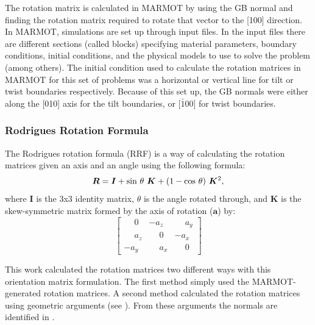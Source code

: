 \documentclass[twoside,senior]{BYUPhys}
\begin{document}
The rotation matrix is calculated in MARMOT by using the GB normal and finding the rotation matrix required to rotate that vector to the [100] direction.  In MARMOT, simulations are set up through input files.  In the input files there are different sections (called blocks) specifying material parameters, boundary conditions, initial conditions, and the physical models to use to solve the problem (among others).  The initial condition used to calculate the rotation matrices in MARMOT for this set of problems was a horizontal or vertical line for tilt or twist boundaries respectively.  Because of this set up, the GB normals were either along the [010] axis for the tilt boundaries, or [$\bar{1}$00] for twist boundaries.

\subsubsection{Rodrigues Rotation Formula\label{PQ:RRF}}
The Rodrigues rotation formula\cite{belongie2006} (RRF) is a way of calculating the rotation matrices given an axis and an angle using the following formula:
\begin{equation}
\label{eq:rrf}
\bm{R} = \bm{I} + \textnormal{sin}\ \theta\ \bm{K} + (1 - \textnormal{cos}\ \theta)\ \bm{K}^2,
\end{equation}
where $\bm{I}$ is the 3x3 identity matrix, $\theta$ is the angle rotated through, and $\bm{K}$ is the skew-symmetric matrix formed by the axis of rotation ($\bm{a}$) by:
\begin{equation}
\label{eq:skewSymMat}
\left[
\begin{array}{ccc}
\phantom{-}0 & -a_z & \phantom{-}a_y \\
\phantom{-}a_z & \phantom{-}0 & -a_x \\
-a_y & \phantom{-}a_x & \phantom{-}0
\end{array}
\right]
\end{equation}

This work calculated the rotation matrices two different ways with this orientation matrix formulation.  The first method simply used the MARMOT-generated rotation matrices.  A second method calculated the rotation matrices using geometric arguments (see ).  From these arguments the normals are identified in .
\end{document}
